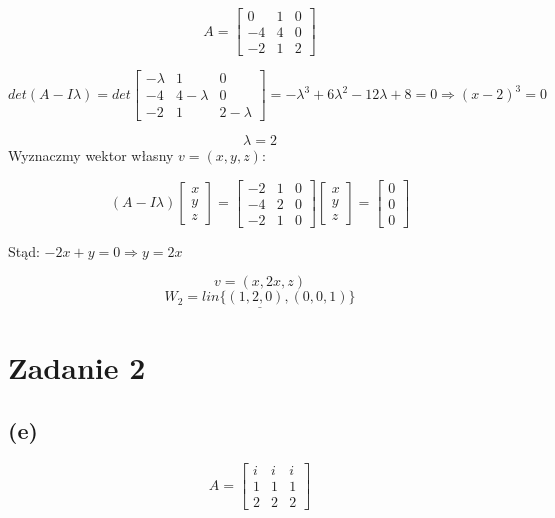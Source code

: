 \documentclass{article}
\begin{document}
$$A = \left[\begin{array}{ccc}0&1&0\\-4&4&0\\-2&1&2\end{array}\right]$$

$$det(A-I\lambda) = det \left[\begin{array}{ccc}-\lambda&1&0\\-4&4-\lambda&0\\ -2&1&2-\lambda\end{array}\right] = -\lambda^3 + 6\lambda^2 -12\lambda + 8 = 0 \Rightarrow (x-2)^3 = 0$$

$$\lambda = 2$$
Wyznaczmy wektor własny $v = (x,y,z)$: \newline

$$(A-I\lambda) \left[\begin{array}{ccc}x\\y\\z\end{array}\right] = \left[\begin{array}{ccc}-2&1&0\\-4&2 &0\\-2&1&0\end{array}\right]  \left[\begin{array}{c}x\\y\\z \end{array}\right] = \left[\begin{array}{c}0\\0\\0 \end{array}\right]$$

Stąd: $-2x+y = 0 \Rightarrow y = 2x$
\newline

$$v = (x,2x,z)$$
$$\underline{W_2 = lin\{(1,2,0),(0,0,1)\}}$$


\section{Zadanie 2}

\subsection{(e)}

$$A = \left[\begin{array}{ccc}i&i&i\\1&1&1\\2&2&2\end{array}\right]$$
\end{document}
